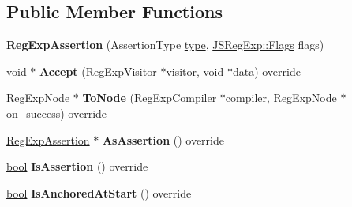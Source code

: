 \subsection*{Public Member Functions}
\begin{DoxyCompactItemize}
\item 
\mbox{\label{classv8_1_1internal_1_1RegExpAssertion_afe41c616ea992de0c1170dd80f72bc10}} 
{\bfseries Reg\+Exp\+Assertion} (Assertion\+Type \mbox{\hyperlink{classstd_1_1conditional_1_1type}{type}}, \mbox{\hyperlink{classv8_1_1base_1_1Flags}{J\+S\+Reg\+Exp\+::\+Flags}} flags)
\item 
\mbox{\label{classv8_1_1internal_1_1RegExpAssertion_a0606f394e1699af2dbbb8d72a466d066}} 
void $\ast$ {\bfseries Accept} (\mbox{\hyperlink{classv8_1_1internal_1_1RegExpVisitor}{Reg\+Exp\+Visitor}} $\ast$visitor, void $\ast$data) override
\item 
\mbox{\label{classv8_1_1internal_1_1RegExpAssertion_a6fbe8b61b97d9cc28bbc5d015b55e8ba}} 
\mbox{\hyperlink{classv8_1_1internal_1_1RegExpNode}{Reg\+Exp\+Node}} $\ast$ {\bfseries To\+Node} (\mbox{\hyperlink{classv8_1_1internal_1_1RegExpCompiler}{Reg\+Exp\+Compiler}} $\ast$compiler, \mbox{\hyperlink{classv8_1_1internal_1_1RegExpNode}{Reg\+Exp\+Node}} $\ast$on\+\_\+success) override
\item 
\mbox{\label{classv8_1_1internal_1_1RegExpAssertion_a6ecb119f925edc2e456428efb6542e7d}} 
\mbox{\hyperlink{classv8_1_1internal_1_1RegExpAssertion}{Reg\+Exp\+Assertion}} $\ast$ {\bfseries As\+Assertion} () override
\item 
\mbox{\label{classv8_1_1internal_1_1RegExpAssertion_aab40f853b6b7862af64c12b6b10f9ef5}} 
\mbox{\hyperlink{classbool}{bool}} {\bfseries Is\+Assertion} () override
\item 
\mbox{\label{classv8_1_1internal_1_1RegExpAssertion_a90ad621f84e8eabd1ecb43999897f5df}} 
\mbox{\hyperlink{classbool}{bool}} {\bfseries Is\+Anchored\+At\+Start} () override
\item 
\mbox{\label{classv8_1_1internal_1_1RegExpAssertion_a4f6c10ba865665f43d18bf7177a1fec2}} 

\end{DoxyCompactItemize}
